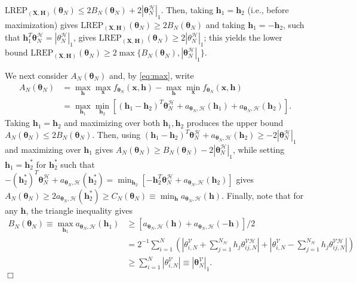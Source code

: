\documentclass[numbib]{imamat}
\theoremstyle{theorem}
\theoremstyle{lemma}
\theoremstyle{example}
\theoremstyle{corollary}
\theoremstyle{definition}
\theoremstyle{remark}
\theoremstyle{approximation}
\theoremstyle{scheme}
\newcommand{\REP}{\mathrm{LREP}}
\newcommand{\elt}{A_{N}(\boldsymbol \theta_N) }
\newcommand{\Gam}{B_{N}(\boldsymbol \theta_N) }
\newcommand{\Gamc}{C_{N}(\boldsymbol \theta_N) }
\begin{document}
\(\REP_{(\boldsymbol X, \boldsymbol H)}(\boldsymbol \theta_N) \leq 2 \Gam + 2 |\boldsymbol \theta_N^{\mathcal{H}} |_1\).
Then, taking \(\boldsymbol h_1=\boldsymbol h_2\) (i.e., before
maximization) gives
\(\REP_{(\boldsymbol X, \boldsymbol H)}(\boldsymbol \theta_N) \geq 2\Gam\)
and taking \(\boldsymbol h_1=-\boldsymbol h_2\), such that
\(\boldsymbol h_1^T \boldsymbol \theta_N^{\mathcal{H}} = |\theta_N^{\mathcal{H}}|_1\),
gives
\(\REP_{(\boldsymbol X, \boldsymbol H)}(\boldsymbol \theta_N) \geq 2|\theta_N^{\mathcal{H}}|_1\);
this yields the lower bound
\(\REP_{(\boldsymbol X, \boldsymbol H)}(\boldsymbol \theta_N)\geq 2\max\{\Gam, |\boldsymbol \theta_N^{\mathcal{H}} |_1\}\).

We next consider \(\elt\) and, by \eqref{eq:max}, write \begin{align*}
\elt &=  \max_{\boldsymbol h}\max_{\boldsymbol x}f_{\boldsymbol \theta_N} (\boldsymbol x , \boldsymbol h) -  \max_{\boldsymbol h}\min_{\boldsymbol x}f_{\boldsymbol \theta_N} (\boldsymbol x , \boldsymbol h)\\
&= \max_{\boldsymbol h_1} \min_{\boldsymbol h_2 }\left[ (\boldsymbol h_1 - \boldsymbol h_2)^T \boldsymbol \theta_N^{\mathcal{H}} + a_{\boldsymbol \theta_N, \mathcal{H}} (\boldsymbol h_1)  + a_{\boldsymbol \theta_N, \mathcal{H}} (\boldsymbol h_2)\right].
\end{align*} Taking \(\boldsymbol h_1=\boldsymbol h_2\) and maximizing
over both \(\boldsymbol h_1,\boldsymbol h_2\) produces the upper bound
\(\elt \leq 2\Gam\). Then, using
\((\boldsymbol h_1 - \boldsymbol h_2)^T \boldsymbol \theta_N^{\mathcal{H}} + a_{\boldsymbol \theta_N, \mathcal{H}} (\boldsymbol h_2) \geq - 2|\boldsymbol \theta_N^{\mathcal{H}} |_1\)
and maximizing over \(\boldsymbol h_1\) gives
\(\elt \geq \Gam- 2|\boldsymbol \theta_N^{\mathcal{H}} |_1\), while
setting \(\boldsymbol h_1=\boldsymbol h_2^*\) for \(\boldsymbol h_2^*\)
such that
\(-(\boldsymbol h_2^*) ^T \boldsymbol \theta_N^{\mathcal{H}} + a_{\boldsymbol \theta_N, \mathcal{H}} (\boldsymbol h_2^*) = \min_{\boldsymbol h_2} [-\boldsymbol h_2^T \boldsymbol \theta_N^{\mathcal{H}} + a_{\boldsymbol \theta_N, \mathcal{H}} (\boldsymbol h_2)]\)
gives
\(\elt \geq 2 a_{\boldsymbol \theta_N, \mathcal{H}} (\boldsymbol h_2^*) \geq \Gamc \equiv \min_{\boldsymbol h} a_{\boldsymbol \theta_N, \mathcal{H}} (\boldsymbol h)\).
Finally, note that for any \(\boldsymbol h\), the triangle inequality
gives \begin{align*}
\Gam  \equiv \max_{\boldsymbol h_1}  a_{\boldsymbol \theta_N, \mathcal{H}} (\boldsymbol h_1) &\geq
[a_{\boldsymbol \theta_N, \mathcal{H}} (\boldsymbol h)  + a_{\boldsymbol \theta_N, \mathcal{H}} (-\boldsymbol h)]/2 \\
&=
2^{-1}\sum_{i=1}^{N } \left(\left| \theta_{i,N}^{\mathcal{V}}   + \sum_{j=1}^{N_{\mathcal{H}}} h_j \theta_{ij,N}^{\mathcal{VH}} \right|
+ \left| \theta_{i,N}^{\mathcal{V}}   - \sum_{j=1}^{N_{\mathcal{H}}} h_j \theta_{ij,N}^{\mathcal{VH}} \right|\right)\\
& \geq \sum_{i=1}^{N }  \left| \theta_{i,N}^{\mathcal{V}} \right| \equiv |\boldsymbol \theta_{N}^{\mathcal{V}}|_1.
\end{align*} \hfill \(\Box\)
\end{document}
